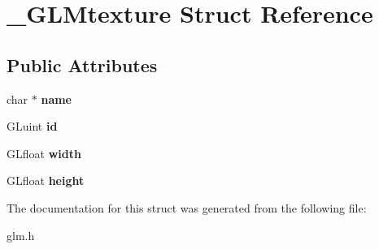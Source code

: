\hypertarget{struct__GLMtexture}{\section{\-\_\-\-G\-L\-Mtexture \-Struct \-Reference}
\label{struct__GLMtexture}
}
\subsection*{\-Public \-Attributes}
\begin{DoxyCompactItemize}
\item 
\hypertarget{struct__GLMtexture_a0afa2e90f6b9a01d26044542892158e6}{char $\ast$ {\bfseries name}}\label{struct__GLMtexture_a0afa2e90f6b9a01d26044542892158e6}

\item 
\hypertarget{struct__GLMtexture_a6009444e239695c1fa918a9086696d18}{\-G\-Luint {\bfseries id}}\label{struct__GLMtexture_a6009444e239695c1fa918a9086696d18}

\item 
\hypertarget{struct__GLMtexture_a71be5705562d250c802a841afd30ff20}{\-G\-Lfloat {\bfseries width}}\label{struct__GLMtexture_a71be5705562d250c802a841afd30ff20}

\item 
\hypertarget{struct__GLMtexture_aae2df18c5805ddf7a341225a08f8b22b}{\-G\-Lfloat {\bfseries height}}\label{struct__GLMtexture_aae2df18c5805ddf7a341225a08f8b22b}

\end{DoxyCompactItemize}


\-The documentation for this struct was generated from the following file\-:\begin{DoxyCompactItemize}
\item 
glm.\-h\end{DoxyCompactItemize}

